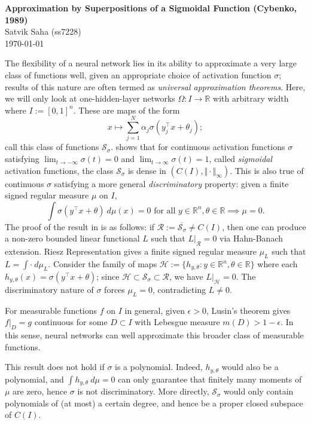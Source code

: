 \documentclass[12pt]{article}
\newcommand{\R}{\mathbb{R}}
\newcommand{\norm}[1]{\Vert#1\Vert}
\begin{document}
\begin{flushleft}
\textbf{%
    Approximation by Superpositions of a Sigmoidal Function (Cybenko, 1989)
} \\
Satvik Saha (ss7228) \\
\today
\end{flushleft}

\vspace{0.1in}


The flexibility of a neural network lies in its ability to approximate a very
large class of functions well, given an appropriate choice of activation
function $\sigma$; results of this nature are often termed as \emph{universal
approximation theorems}.
Here, we will only look at one-hidden-layer networks $\Omega\colon I \to \R$
with arbitrary width where $I := [0, 1]^n$.
These are maps of the form \[
    x \mapsto \sum_{j = 1}^N \alpha_j \sigma(y_j^\top x + \theta_j);
\] call this class of functions $\mathscr{S}_\sigma$.
\cite{cybenko89} shows that for continuous activation functions $\sigma$
satisfying $\lim_{t \to -\infty} \sigma(t) = 0$ and $\lim_{t \to \infty}
\sigma(t) = 1$, called \emph{sigmoidal} activation functions, the class
$\mathscr{S}_\sigma$ is dense in $(C(I), \norm{\cdot}_\infty)$.
This is also true of continuous $\sigma$ satisfying a more general
\emph{discriminatory} property: given a finite signed regular measure $\mu$ on
$I$, \[
    \int \sigma(y^\top x + \theta) \:d\mu(x) = 0\text{ for all } y \in \R^n, \theta \in \R
        \implies \mu = 0.
\] The proof of the result in \cite{cybenko89} is as follows: if $\mathscr{R}
:= \overline{\mathscr{S}_\sigma} \neq C(I)$, then one can produce a non-zero
bounded linear functional $L$ such that $L|_\mathscr{R} = 0$ via Hahn-Banach
extension.
Riesz Representation gives a finite signed regular measure $\mu_L$ such that $L
= \int \cdot \:d\mu_L$.
Consider the family of maps $\mathscr{H} := \{h_{y, \theta}: y \in \R^n, \theta
\in \R\}$ where each $h_{y, \theta}(x) = \sigma(y^\top x + \theta)$; since $
\mathscr{H} \subset \mathscr{S}_\sigma \subset \mathscr{R}$, we have
$L|_\mathscr{H} = 0$.
The discriminatory nature of $\sigma$ forces $\mu_L = 0$, contradicting $L \neq
0$.

For measurable functions $f$ on $I$ in general, given $\epsilon > 0$, Lusin's
theorem gives $f|_D = g$ continuous for some $D \subset I$ with Lebesgue
measure $m(D) > 1 - \epsilon$.
In this sense, neural networks can well approximate this broader class of
measurable functions.

This result does not hold if $\sigma$ is a polynomial.
Indeed, $h_{y, \theta}$ would also be a polynomial, and $\int h_{y, \theta}
\:d\mu = 0$ can only guarantee that finitely many moments of $\mu$ are zero,
hence $\sigma$ is not discriminatory.
More directly, $\mathscr{S}_\sigma$ would only contain polynomials of (at most)
a certain degree, and hence be a proper closed subspace of $C(I)$.
\end{document}
